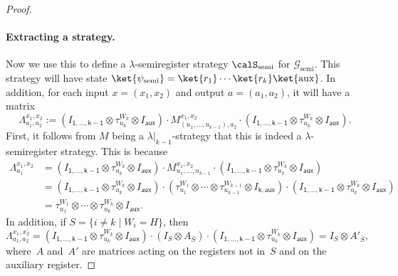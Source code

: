 \documentclass[11pt]{article}
\newcommand{\register}{\lambda}
\newcommand{\game}{\mathscr{G}}
\newcommand{\reg}[1]{{\mathsf{#1}}}
\begin{document}
\begin{proof}
\paragraph{Extracting a strategy.}

Now we use this to define a $\register$-semiregister strategy $\calS_{\mathrm{semi}}$ for $\game_{\mathrm{semi}}$.
This strategy will have state $\ket{\psi_{\mathrm{semi}}} = \ket{r_1}\cdots\ket{r_k} \ket{\mathrm{aux}}$.
In addition, for each input $x = (x_1, x_2)$ and output $a = (a_1, a_2)$, it will have a matrix
\begin{equation*}
\Lambda_{a_1, a_2}^{x_1, x_2} := (I_{\reg{1, \ldots, k-1}} \otimes \tau^{W_k}_{u_k} \otimes I_{\reg{aux}})\cdot
M_{(u_1, \ldots, u_{k-1}),a_2}^{x_1, x_2} \cdot (I_{\reg{1, \ldots, k-1}} \otimes \tau^{W_k}_{u_k} \otimes I_{\reg{aux}}).
\end{equation*}
First, it follows from $M$ being a $\register|_{k-1}$-strategy that this is indeed a $\register$-semiregister strategy.
This is because
\begin{align*}
\Lambda_{a_1}^{x_1, x_2}
&= (I_{\reg{1, \ldots, k-1}} \otimes \tau^{W_k}_{u_k} \otimes I_{\reg{aux}})\cdot
	M_{u_1, \ldots, u_{k-1}}^{x_1, x_2} \cdot (I_{\reg{1, \ldots, k-1}} \otimes \tau^{W_k}_{u_k} \otimes I_{\reg{aux}})\\
&= (I_{\reg{1, \ldots, k-1}} \otimes \tau^{W_k}_{u_k} \otimes I_{\reg{aux}})\cdot
	(\tau^{W_1}_{u_1} \otimes \cdots \otimes \tau^{W_{k-1}}_{u_{k-1}} \otimes I_{\reg{k, aux}})
	\cdot (I_{\reg{1, \ldots, k-1}} \otimes \tau^{W_k}_{u_k} \otimes I_{\reg{aux}})\\
&= \tau^{W_1}_{u_1} \otimes \cdots \otimes \tau^{W_k}_{u_k} \otimes I_{\reg{aux}}.
\end{align*}
In addition, if $S = \{i \neq k \mid W_i = H\}$, then
\begin{equation*}
\Lambda_{a_1, a_2}^{x_1, x_2}
= (I_{\reg{1, \ldots, k-1}} \otimes \tau^{W_k}_{u_k} \otimes I_{\reg{aux}})\cdot
(I_S \otimes A_{\overline{S}}) \cdot (I_{\reg{1, \ldots, k-1}} \otimes \tau^{W_k}_{u_k} \otimes I_{\reg{aux}})
= I_S \otimes A'_{\overline{S}},
\end{equation*}
where~$A$ and~$A'$ are matrices acting on the registers not in~$S$ and on the auxiliary register.


\end{proof}
\end{document}

